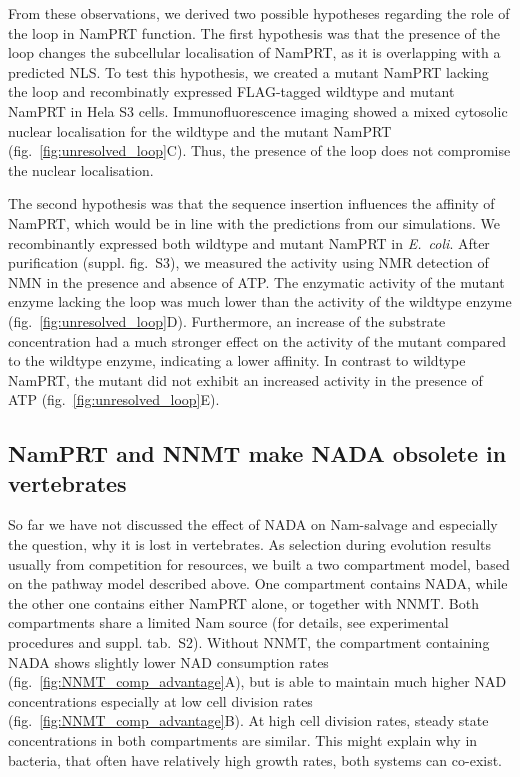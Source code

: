 From these observations, we derived two possible hypotheses regarding the role of the loop in NamPRT function. The first hypothesis was that the presence of the loop changes the subcellular localisation of NamPRT, as it is overlapping with a predicted NLS. To test this hypothesis, we created a mutant NamPRT lacking the loop and recombinatly expressed FLAG-tagged wildtype and mutant NamPRT in Hela S3 cells. Immunofluorescence imaging showed a mixed cytosolic nuclear localisation for the wildtype and the mutant NamPRT (fig.~\ref{fig:unresolved_loop}C). Thus, the presence of the loop does not compromise the nuclear localisation.

The second hypothesis was that the sequence insertion influences the affinity of NamPRT, which would be in line with the predictions from our simulations. We recombinantly expressed both wildtype and mutant NamPRT in \textit{E.~coli}. After purification (suppl. fig.~S3), we measured the activity using NMR detection of NMN in the presence and absence of ATP. The enzymatic activity of the mutant enzyme lacking the loop was much lower than the activity of the wildtype enzyme (fig.~\ref{fig:unresolved_loop}D). Furthermore, an increase of the substrate concentration had a much stronger effect on the activity of the mutant compared to the wildtype enzyme, indicating a lower affinity. In contrast to wildtype NamPRT, the mutant did not exhibit an increased activity in the presence of ATP (fig.~\ref{fig:unresolved_loop}E).


\subsection{NamPRT and NNMT make NADA obsolete in vertebrates}

So far we have not discussed the effect of NADA on Nam-salvage and especially the question, why it is lost in vertebrates. As selection during evolution results usually from competition for resources, we built a two compartment model, based on the pathway model described above. One compartment contains NADA, while the other one contains either NamPRT alone, or together with NNMT. Both compartments share a limited  Nam source (for details, see experimental procedures and suppl. tab.~S2). Without NNMT, the compartment containing NADA shows slightly lower NAD consumption rates (fig.~\ref{fig:NNMT_comp_advantage}A), but is able to maintain much higher NAD concentrations especially at low cell division rates (fig.~\ref{fig:NNMT_comp_advantage}B). At high cell division rates, steady state concentrations in both compartments are similar. This might explain why in bacteria, that often have relatively high growth rates, both systems can co-exist.

